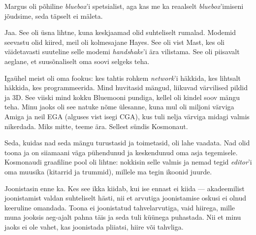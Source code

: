 Margus 
oli põhiline \emph{bluebox}'i spetsialist, aga kas me ka reaalselt 
\emph{bluebox}'imiseni jõudsime, seda täpselt ei mäleta.


Jaa. See oli üsna lihtne, kuna 
keskjaamad olid suhteliselt rumalad. Modemid seevastu olid kiired, meil oli 
kolmesajane Hayes. See oli vist
Mast, kes oli väidetavasti suuteline selle modemi 
\emph{handshake}'i ära vilistama. See oli 
piisavalt aeglane, et
suusõnaliselt oma soovi selgeks teha.

Igaühel meist oli oma fookus: kes tahtis rohkem 
\emph{network}'i häkkida, kes lihtsalt häkkida, kes 
programmeerida. Mind huvitasid mängud, liikuvad värvilised 
pildid ja 3D. See viiski mind kokku
Bluemooni pundiga, kellel oli kindel soov mängu 
teha. Minu jaoks oli see natuke nõme ülesanne, kuna 
mul oli miljoni värviga Amiga ja neil 
EGA (alguses vist isegi CGA), kus tuli nelja värviga 
midagi valmis nikerdada. Miks mitte, teeme ära. Sellest sündis 
Kosmonaut. 

Seda, kuidas nad seda mängu turustasid ja toimetasid, oli lahe vaadata. Nad 
olid toona ja on siiamaani väga pühendunud ja keskendunud oma asja 
tegemisele. Kosmonaudi graafiline pool oli lihtne: nokkisin selle valmis ja 
nemad tegid 
\emph{editor}'i oma muusika (kitarrid ja trummid), millele ma tegin ikoonid 
juurde.


Joonistasin enne ka. Kes see ikka kiidab, kui ise ennast ei kiida --- 
akadeemilist joonistamist valdan suhteliselt hästi, nii et arvutiga 
joonistamise oskusi 
ei olnud keeruline omandada. Toona ei joonistatud tahvelarvutiga,
vaid hiirega, mille muna jooksis aeg-ajalt pahna täis ja seda tuli
küünega puhastada. Nii et minu jaoks ei ole vahet, kas joonistada
pliiatsi, hiire või tahvliga.

